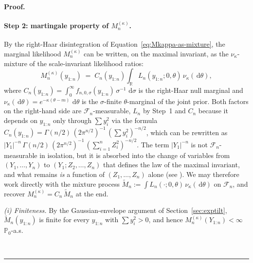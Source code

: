 \documentclass{article}%
\newenvironment{proof}[1][Proof]{\noindent\textbf{#1.} }{\ \rule{0.5em}{0.5em}}
\newcommand{\dd}{\,\mathrm{d}}
\newcommand{\1}{\mathbf{1}}
\begin{document}
\begin{proof}
\paragraph{Step 2: martingale property of $M_n^{(\kappa)}$.}
By the right-Haar disintegration of Equation~\eqref{eq:Mkappa-as-mixture}, the marginal likelihood $M_n^{(\kappa)}$ can be written, on the maximal invariant,
as the $\nu_\kappa$-mixture of the scale-invariant likelihood ratios:
\begin{equation}\label{eq:M-as-mixture-Ln}
   M_n^{(\kappa)}(y_{1:n})
   \;=\; C_n(y_{1:n})\int_\mathbb{R} L_n(y_{1:n};0,\theta)\,\nu_\kappa(\dd\theta),
\end{equation}
where $C_n(y_{1:n}) = \int_0^\infty f_{n,0,\sigma}(y_{1:n})\,\sigma^{-1}\,\dd\sigma$
is the right-Haar null marginal and $\nu_\kappa(\dd\theta) = e^{-\kappa(\theta-m)}\,\dd\theta$
is the $\sigma$-finite $\theta$-marginal of the joint prior. Both factors on
the right-hand side are $\mathcal{F}_n$-measurable, $L_n$ by Step~1 and $C_n$ because it depends on $y_{1:n}$ only
through $\sum y_i^2$ via the formula
$C_n(y_{1:n}) = \Gamma(n/2)\,(2\pi^{n/2})^{-1}\,(\sum y_i^2)^{-n/2}$, which can be rewritten as
$|Y_1|^{-n}\,\Gamma(n/2)\,(2\pi^{n/2})^{-1}\,(\sum_{i=1}^n Z_i^2)^{-n/2}$. The term $|Y_1|^{-n}$ is not $\mathcal{F}_n$-measurable in isolation, but it is absorbed into the change of variables from $(Y_1,\dots,Y_n)$ to
$(Y_1; Z_2,\dots,Z_n)$ that defines the law of the maximal invariant, and
what remains \emph{is} a function of $(Z_1,\dots,Z_n)$ alone (see
\cite[proof of Cor.~4.6]{Wang2025}). We may therefore work directly with the
mixture process $\widetilde M_n := \int L_n(\cdot;0,\theta)\,\nu_\kappa(\dd\theta)$
on $\mathcal{F}_n$, and recover $M_n^{(\kappa)} = C_n\,\widetilde M_n$ at the
end.

\smallskip\noindent\emph{(i) Finiteness.}
By the Gaussian-envelope argument of Section~\ref{sec:exptilt},
$\widetilde M_n(y_{1:n})$ is finite for every $y_{1:n}$ with $\sum y_i^2 > 0$,
and hence $M_n^{(\kappa)}(Y_{1:n}) < \infty$ $\mathbb{P}_0$-a.s.


\end{proof}
\end{document}
